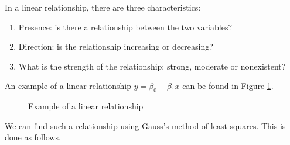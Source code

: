 In a linear relationship, there are three characteristics:

\begin{enumerate}
  \item Presence: is there a relationship between the two variables?
  \item Direction: is the relationship increasing or decreasing?
  \item What is the strength of the relationship: strong, moderate or nonexistent?
\end{enumerate}

An example of a linear relationship $y = \beta_{0} + \beta_{1}x$ can be found in Figure \ref{fig:regression-example}.

\begin{figure}[t]
  \caption{Example of a linear relationship}
  \label{fig:regression-example}
\end{figure}

We can find such a relationship using Gauss's  method of least squares. This is done as follows.

